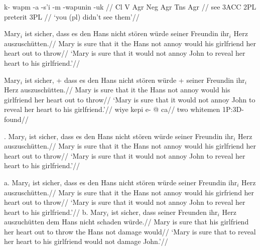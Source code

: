 
\ex[lingstyle=Potawatomi]
\begingl
\gla k- wapm -a -s'i -m -wapunin -uk //
\glcat Cl V Agr Neg Agr Tns Agr //
 see {3\sc ACC} {} 2{\sc PL} preterit 3{\sc PL} //
\glft `you (pl) didn't see them'//
\endgl
\xe

\ex
\begingl
\gla Mary$_i$ ist sicher, dass es den Hans nicht st\"oren w\"urde
seiner Freundin ihr$_i$ Herz auszusch\"utten.//
\glb Mary is sure that it the Hans not annoy would
his girlfriend her heart {out to
throw}//
\glft  `Mary is sure that it would not annoy John to reveal her
heart to his girlfriend.'//
\endgl
\xe

\def\glexample{\the\excnt}
\ex
\begingl
\gla Mary$_i$ ist sicher, + dass es den Hans nicht st\"oren w\"urde
+ seiner Freundin ihr$_i$ Herz auszusch\"utten.//
\glb Mary is sure that it the Hans not annoy would
his girlfriend her heart {out to
throw}//
\glft  `Mary is sure that it would not annoy John to reveal her
heart to his girlfriend.'//
\endgl
\xe
\ex
\begingl
\gla wiye kepi e- @ ca//
\glb two whitemen \sc1P:3D- found//
\endgl
\xe

\exdisplay
{}.\quad
\gla Mary$_i$ ist sicher, dass es den Hans nicht st\"oren w\"urde
seiner Freundin ihr$_i$ Herz auszusch\"utten.//
\glb Mary is sure that it the Hans not annoy would
his girlfriend her heart
{out to throw}//
\glft  `Mary is sure that it would not annoy John to reveal her
heart to his girlfriend.'//
\endgl
\xe

\ex
a.\quad
\begingl[glwidth=2.6in]
\gla Mary$_i$ ist sicher, dass es den Hans nicht st\"oren w\"urde
seiner Freundin ihr$_i$ Herz auszusch\"utten.//
\glb Mary is sure that it the Hans not annoy would
his girfriend her heart {out to
throw}//
\glft  `Mary is sure that it would not annoy John to reveal her
heart to his girlfriend.'//
\endgl
\hfil
b.\quad
\begingl[glwidth=2.6in]
\gla Mary$_i$ ist sicher, dass seiner Freunden ihr$_i$ Herz
auszuch\"utten dem Hans nicht schaden w\"urde.//
\glb Mary is sure that his girlfriend her
heart {out to throw} the Hans not damage would//
\glft `Mary is sure that to reveal her heart to his girlfriend
would not damage John.'//
\endgl
\xe



